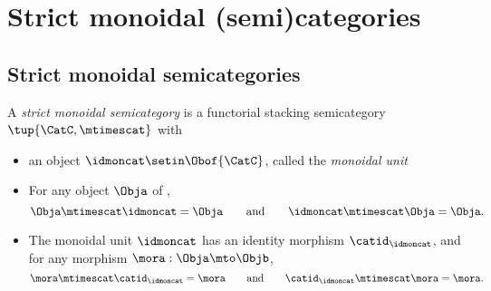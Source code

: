 
\section{Strict monoidal (semi)categories}

\subsection{Strict monoidal semicategories}

\begin{ctdefinition}
    \label{def:strict-monoidal-semicat}
    A \emph{strict monoidal semicategory} is a functorial stacking semicategory $\tup{\CatC, \mtimescat}$ with

    \constit

    \begin{itemize}
        \item an object $\idmoncat \setin \Obof{\CatC}$, called the \emph{monoidal unit}
    \end{itemize}

    \condit

    \begin{itemize}
        \item For any object $\Obja$ of \CatC,
              \begin{equation}
                  \Obja \mtimescat \idmoncat = \Obja \qquad \text{and} \qquad  \idmoncat \mtimescat  \Obja = \Obja.
              \end{equation}
        \item The monoidal unit $\idmoncat$ has an identity morphism $\catid_\idmoncat$, and for any morphism $\mora: \Obja \mto \Objb$,
              \begin{equation}
                  \mora \mtimescat \catid_\idmoncat = \mora \qquad \text{and} \qquad \catid_\idmoncat \mtimescat  \mora = \mora.
              \end{equation}
    \end{itemize}

\end{ctdefinition}



